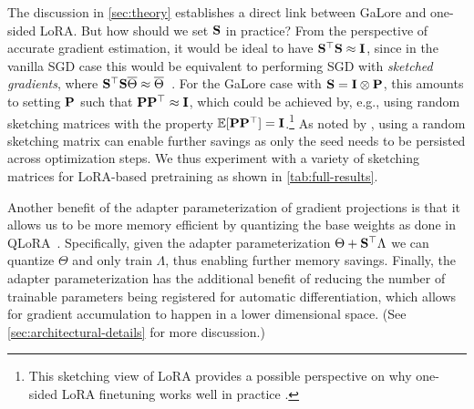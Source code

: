The discussion in \cref{sec:theory} establishes a direct link between GaLore and one-sided LoRA. 
But how should we set ${\mathbf{S}}$ in practice?
From the perspective of accurate gradient estimation, it would  be ideal to have ${\mathbf{S}}^{\top}{\mathbf{S}} \approx {\mathbf{I}}_{}$, since in the vanilla SGD case this would be equivalent to performing SGD with \emph{sketched gradients}, where ${\mathbf{S}}^{\top}{\mathbf{S}}\overline{\Theta} \approx \overline{\Theta}$~\citep{murray-rand-nla}. For the GaLore case with ${\mathbf{S}} = {\mathbf{I}} \otimes {\mathbf{P}}$, this amounts to setting ${\mathbf{P}}$ such that ${\mathbf{P}}{\mathbf{P}}^\top \approx {\mathbf{I}}$, which could be achieved by, e.g., using random sketching matrices with the property $\mathbb{E}[{\mathbf{P}}{\mathbf{P}}^\top] = \mathbf{I}$.\footnote{This sketching view of LoRA  provides a possible perspective on why one-sided LoRA finetuning works well in practice \citep{zhang2023lora,zhu2024asymmetry,hayou2024lora}.} As noted by \citet{hao2024flora}, using a random sketching matrix can enable further savings as only the seed needs to be persisted across optimization steps. We thus experiment with a variety of sketching matrices for LoRA-based pretraining as shown in  \cref{tab:full-results}.



Another benefit of the adapter parameterization of gradient projections is that it allows us to be more memory efficient by quantizing the base weights as done in QLoRA~\citep{qlora}. Specifically, given the adapter parameterization $\Theta + {\mathbf{S}}^\top \Lambda$ we can quantize $\Theta$ and only train $\Lambda$, thus enabling further memory savings. Finally, the adapter parameterization has the additional benefit of reducing the number of trainable parameters being registered for automatic differentiation, which allows for gradient accumulation to happen in a lower dimensional space. (See  \cref{sec:architectural-details} for more discussion.)





 












 





